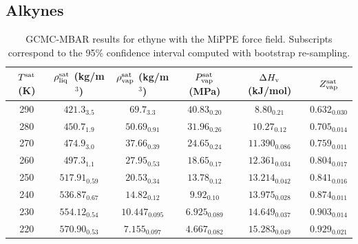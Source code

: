 \documentclass[journal=jctc,manuscript=article]{achemso}
\begin{document}
\newpage
\clearpage

\subsection{Alkynes}

\begin{table}[htb!]
	\caption{GCMC-MBAR results for ethyne with the MiPPE force field. Subscripts correspond to the 95\% confidence interval computed with bootstrap re-sampling.}
	\begin{center}
		\begin{tabular}{|c|c|c|c|c|c|}
			\hline
			$T^{\rm sat}$ (K) & $\rho_{\rm liq}^{\rm sat}$ (kg/m$^3$) & $\rho_{\rm vap}^{\rm sat}$ (kg/m$^3$) & $P_{\rm vap}^{\rm sat}$ (MPa) & $\Delta H_{\rm v}$ (kJ/mol) & $Z_{\rm vap}^{\rm sat}$ \\ \hline
			290 & $421.3_{3.5}$ & $69.7_{3.3}$ & $40.83_{0.20}$ & $8.80_{0.21}$ & $0.632_{0.030}$ \\
			280 & $450.7_{1.9}$ & $50.69_{0.91}$ & $31.96_{0.26}$ & $10.27_{0.12}$ & $0.705_{0.014}$ \\
			270 & $474.9_{3.0}$ & $37.66_{0.39}$ & $24.65_{0.24}$ & $11.390_{0.086}$ & $0.759_{0.011}$ \\
			260 & $497.3_{1.1}$ & $27.95_{0.53}$ & $18.65_{0.17}$ & $12.361_{0.034}$ & $0.804_{0.017}$ \\
			250 & $517.91_{0.59}$ & $20.53_{0.34}$ & $13.78_{0.12}$ & $13.214_{0.042}$ & $0.841_{0.016}$ \\
			240 & $536.87_{0.67}$ & $14.82_{0.12}$ & $9.92_{0.10}$ & $13.975_{0.028}$ & $0.874_{0.011}$ \\
			230 & $554.12_{0.54}$ & $10.447_{0.095}$ & $6.925_{0.089}$ & $14.649_{0.037}$ & $0.903_{0.014}$ \\
			220 & $570.90_{0.53}$ & $7.155_{0.097}$ & $4.667_{0.082}$ & $15.283_{0.049}$ & $0.929_{0.021}$ \\
			\hline
		\end{tabular}
	\end{center}
\end{table}
\end{document}
